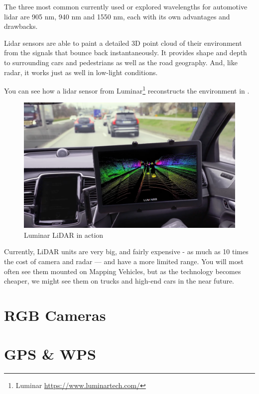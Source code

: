 The three most common currently used or explored wavelengths for automotive
lidar are 905 nm, 940 nm and 1550 nm, each with its own advantages and
drawbacks.

Lidar sensors are able to paint a detailed 3D point cloud of their environment
from the signals that bounce back instantaneously. It provides shape and depth
to surrounding cars and pedestrians as well as the road geography. And, like
radar, it works just as well in low-light conditions.

You can see how a lidar sensor from Luminar\footnote{Luminar
\url{https://www.luminartech.com/}} reconstructs the environment in
.

\begin{figure}[!ht]
    \centering
    \includegraphics[width=150mm, keepaspectratio]{figures/luminar.png}
    \caption{Luminar LiDAR in action}
    \label{fig:luminar}
\end{figure}


Currently, LiDAR units are very big, and fairly expensive - as much as 10 times
the cost of camera and radar — and have a more limited range. You will most
often see them mounted on Mapping Vehicles, but as the technology becomes
cheaper, we might see them on trucks and high-end cars in the near future.

\section{RGB Cameras}



\section{GPS \& WPS}

